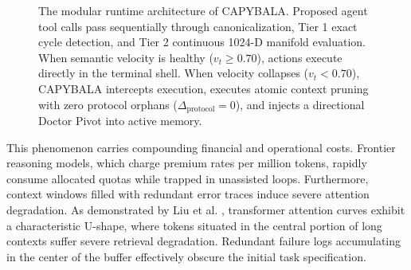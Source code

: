 \documentclass[journal]{IEEEtran}
\begin{document}
\begin{figure}[!t]
{%
}
\caption{The modular runtime architecture of CAPYBALA. Proposed agent tool calls pass sequentially through canonicalization, Tier 1 exact cycle detection, and Tier 2 continuous 1024-D manifold evaluation. When semantic velocity is healthy ($v_t \ge 0.70$), actions execute directly in the terminal shell. When velocity collapses ($v_t < 0.70$), CAPYBALA intercepts execution, executes atomic context pruning with zero protocol orphans ($\Delta_{\text{protocol}} = 0$), and injects a directional Doctor Pivot into active memory.}
\label{fig:pipeline_architecture}
\end{figure}

This phenomenon carries compounding financial and operational costs. Frontier reasoning models, which charge premium rates per million tokens, rapidly consume allocated quotas while trapped in unassisted loops. Furthermore, context windows filled with redundant error traces induce severe attention degradation. As demonstrated by Liu et al. \cite{liu2024lost}, transformer attention curves exhibit a characteristic U-shape, where tokens situated in the central portion of long contexts suffer severe retrieval degradation. Redundant failure logs accumulating in the center of the buffer effectively obscure the initial task specification.
\end{document}
